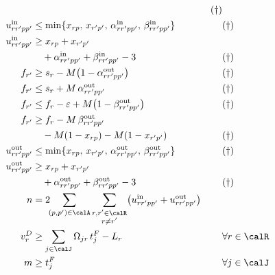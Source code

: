 \begin{align}
    && (\dagger) \label{eq:betaInLB}\\
  u^{\mathrm{in}}_{rr'pp'} &\le \min\{x_{rp},\, x_{r'p'},\,
                                   \alpha^{\mathrm{in}}_{rr'pp'},\,
                                   \beta^{\mathrm{in}}_{rr'pp'}\}
    && (\dagger) \label{eq:uInUB}\\
  u^{\mathrm{in}}_{rr'pp'} &\ge x_{rp} + x_{r'p'} \notag\\
                           &\quad + \alpha^{\mathrm{in}}_{rr'pp'}
                           + \beta^{\mathrm{in}}_{rr'pp'} - 3
    && (\dagger) \label{eq:uInLB}\\
  f_{r'} &\ge s_r - M\bigl(1 - \alpha^{\mathrm{out}}_{rr'pp'}\bigr)
    && (\dagger) \label{eq:alphaOutLB}\\
  f_{r'} &\le s_r + M\,\alpha^{\mathrm{out}}_{rr'pp'}
    && (\dagger) \label{eq:alphaOutUB}\\
  f_{r'} &\le f_r - \varepsilon
              + M\bigl(1 - \beta^{\mathrm{out}}_{rr'pp'}\bigr)
    && (\dagger) \label{eq:betaOutUB}\\
  f_{r'} &\ge f_r - M\,\beta^{\mathrm{out}}_{rr'pp'} \notag\\
         &\quad - M(1 - x_{rp}) - M(1 - x_{r'p'})
    && (\dagger) \label{eq:betaOutLB}\\
  u^{\mathrm{out}}_{rr'pp'} &\le \min\{x_{rp},\, x_{r'p'},\,
                                    \alpha^{\mathrm{out}}_{rr'pp'},\,
                                    \beta^{\mathrm{out}}_{rr'pp'}\}
    && (\dagger) \label{eq:uOutUB}\\
  u^{\mathrm{out}}_{rr'pp'} &\ge x_{rp} + x_{r'p'} \notag\\
                            &\quad + \alpha^{\mathrm{out}}_{rr'pp'}
                            + \beta^{\mathrm{out}}_{rr'pp'} - 3
    && (\dagger) \label{eq:uOut}\\
  n &= 2 \!\!\sum_{(p,p') \in \calA}
         \sum_{\substack{r, r' \in \calR\\ r \ne r'}}
         \bigl(u^{\mathrm{in}}_{rr'pp'} + u^{\mathrm{out}}_{rr'pp'}\bigr)
    && \label{eq:movements}\\
  v^D_r &\ge \sum_{j \in \calJ} \Omega_{jr}\, t^F_j - L_r
    && \forall r \in \calR \label{eq:delay}\\
  m &\ge t^F_j
    && \forall j \in \calJ \label{eq:makespan}
\end{align}


